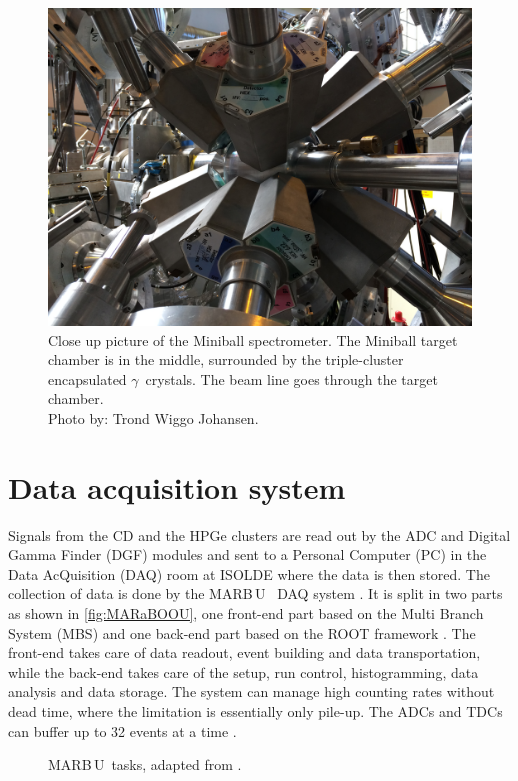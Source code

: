 \documentclass[twoside,english]{uiofysmaster/uiofysmaster}
\newcommand{\ga}{$\gamma$}
\newcommand{\MBOU}{MAR\belowbaseline[-2pt]{a}B\stackinset{l}{3pt}{b}{-3pt}{O}{O}\,U}
\begin{document}
\begin{figure}[ht]
	\centering
	\includegraphics[width=\linewidth]{Images/IMG3917.JPG}
	\caption{Close up picture of the Miniball spectrometer. The Miniball target chamber is in the middle, surrounded by the triple-cluster encapsulated \ga\ crystals. The beam line goes through the target chamber. \\ Photo by: Trond Wiggo Johansen.}
	\label{fig:MBSpectCU}
\end{figure}


\section{Data acquisition system}
Signals from the CD and the HPGe clusters are read out by the ADC and Digital Gamma Finder (DGF) modules and sent to a Personal Computer (PC) in the Data AcQuisition (DAQ) room at ISOLDE where the data is then stored. The collection of data is done by the \MBOU\ \cite{Maraboou} DAQ system \cite{MB-spect}. It is split in two parts as shown in \autoref{fig:MARaBOOU}, one front-end part based on the Multi Branch System (MBS) \cite{MBS} and one back-end part based on the ROOT framework \cite{ROOT}. The front-end takes care of data readout, event building and data transportation, while the back-end takes care of the setup, run control, histogramming, data analysis and data storage. The system can manage high counting rates without dead time, where the limitation is essentially only pile-up. The ADCs and TDCs can buffer up to 32 events at a time \cite{MB-spect}. 


\begin{figure}[ht]
	\centering
	
	\caption{\protect\MBOU\ tasks, adapted from \cite{Maraboou}.}
	\label{fig:MARaBOOU}
\end{figure}
\end{document}
